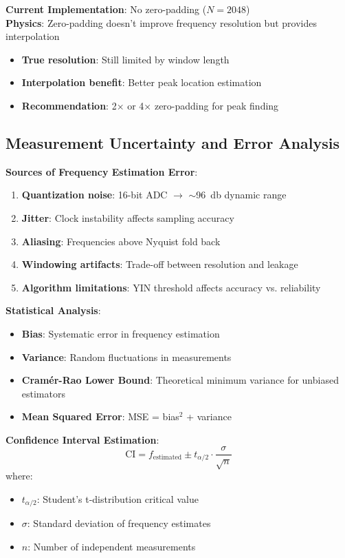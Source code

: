 \documentclass[11pt,a4paper]{article}
\begin{document}
\textbf{Current Implementation}: No zero-padding ($N = 2048$) \\
\textbf{Physics}: Zero-padding doesn't improve frequency resolution but provides interpolation
\begin{itemize}
    \item \textbf{True resolution}: Still limited by window length
    \item \textbf{Interpolation benefit}: Better peak location estimation
    \item \textbf{Recommendation}: 2× or 4× zero-padding for peak finding
\end{itemize}

\subsection{Measurement Uncertainty and Error Analysis}

\textbf{Sources of Frequency Estimation Error}:
\begin{enumerate}
    \item \textbf{Quantization noise}: 16-bit ADC $\rightarrow$ $\sim$\SI{96}{\decibel} dynamic range
    \item \textbf{Jitter}: Clock instability affects sampling accuracy
    \item \textbf{Aliasing}: Frequencies above Nyquist fold back
    \item \textbf{Windowing artifacts}: Trade-off between resolution and leakage
    \item \textbf{Algorithm limitations}: YIN threshold affects accuracy vs. reliability
\end{enumerate}

\textbf{Statistical Analysis}:
\begin{itemize}
    \item \textbf{Bias}: Systematic error in frequency estimation
    \item \textbf{Variance}: Random fluctuations in measurements
    \item \textbf{Cramér-Rao Lower Bound}: Theoretical minimum variance for unbiased estimators
    \item \textbf{Mean Squared Error}: MSE = bias$^2$ + variance
\end{itemize}

\textbf{Confidence Interval Estimation}:
\begin{equation}
\text{CI} = f_{\text{estimated}} \pm t_{\alpha/2} \cdot \frac{\sigma}{\sqrt{n}}
\end{equation}
where:
\begin{itemize}
    \item $t_{\alpha/2}$: Student's t-distribution critical value
    \item $\sigma$: Standard deviation of frequency estimates
    \item $n$: Number of independent measurements
\end{itemize}
\end{document}
